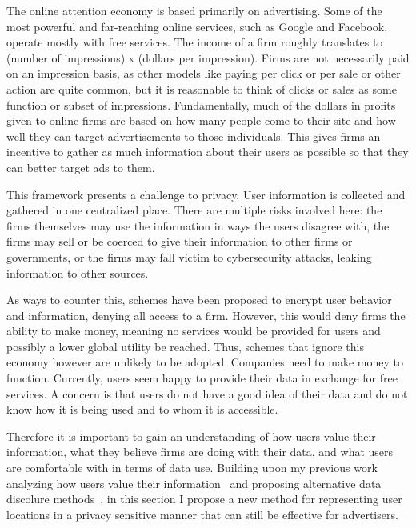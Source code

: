
The online attention economy is based primarily on advertising.
Some of the most powerful and far-reaching online services, such as Google and Facebook, operate mostly with free services.
The income of a firm roughly translates to (number of impressions) x (dollars per impression).
Firms are not necessarily paid on an impression basis, as other models like paying per click or per sale or other action are quite common, but it is reasonable to think of clicks or sales as some function or subset of impressions.
Fundamentally, much of the dollars in profits given to online firms are based on how many people come to their site and how well they can target advertisements to those individuals.
This gives firms an incentive to gather as much information about their users as possible so that they can better target ads to them.

This framework presents a challenge to privacy.
User information is collected and gathered in one centralized place.
There are multiple risks involved here: the firms themselves may use the information in ways the users disagree with, the firms may sell or be coerced to give their information to other firms or governments, or the firms may fall victim to cybersecurity attacks, leaking information to other sources.

As ways to counter this, schemes have been proposed to encrypt user behavior and information, denying all access to a firm.
However, this would deny firms the ability to make money, meaning no services would be provided for users and possibly a lower global utility be reached.
Thus, schemes that ignore this economy however are unlikely to be adopted.
Companies need to make money to function.
Currently, users seem happy to provide their data in exchange for free services.
A concern is that users do not have a good idea of their data and do not know how it is being used and to whom it is accessible.

Therefore it is important to gain an understanding of how users value their information, what they believe firms are doing with their data, and what users are comfortable with in terms of data use.
Building upon my previous work analyzing how users value their information~\cite{Carrascal} and proposing alternative data discolure methods~\cite{Riederer:2011ta}, in this section I propose a new method for representing user locations in a privacy sensitive manner that can still be effective for advertisers.
